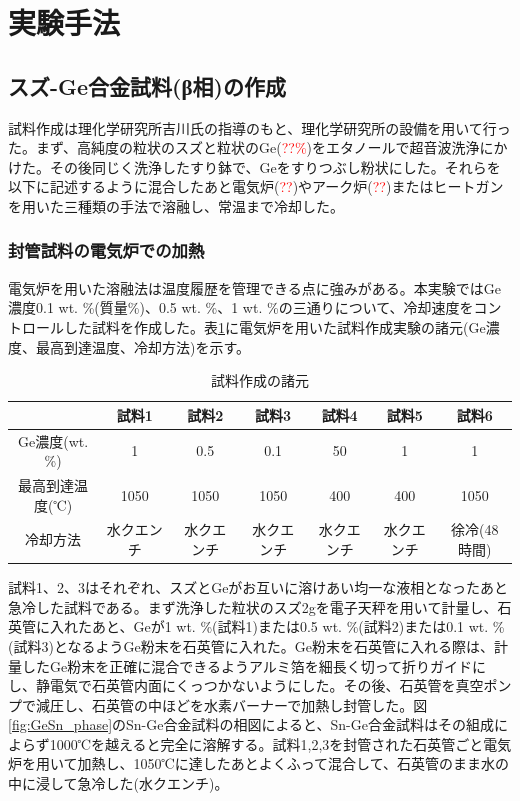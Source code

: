 \section{実験手法}
\subsection{スズ-Ge合金試料(β相)の作成}
試料作成は理化学研究所吉川氏の指導のもと、理化学研究所の設備を用いて行った。まず、高純度の粒状のスズと粒状のGe(\textcolor{red}{??\%})をエタノールで超音波洗浄にかけた。その後同じく洗浄したすり鉢で、Geをすりつぶし粉状にした。それらを以下に記述するように混合したあと電気炉(\textcolor{red}{??})やアーク炉(\textcolor{red}{??})またはヒートガンを用いた三種類の手法で溶融し、常温まで冷却した。

\subsubsection{封管試料の電気炉での加熱}
電気炉を用いた溶融法は温度履歴を管理できる点に強みがある。本実験ではGe濃度0.1 wt. \%(質量\%)、0.5 wt. \%、1 wt. \%の三通りについて、冷却速度をコントロールした試料を作成した。表\ref{tab:sample_prep_elec}に電気炉を用いた試料作成実験の諸元(Ge濃度、最高到達温度、冷却方法)を示す。
\begin{table}[!h]
    \begin{center}
  \begin{tabular}{c|cccccc}
    & 試料1 & 試料2 & 試料3 & 試料4 & 試料5 & 試料6 \\ \hline
    Ge濃度(wt. \%)  & 1 & 0.5 &  0.1 & 50 & 1 & 1\\
   最高到達温度(℃)  & 1050　& 1050 &  1050 & 400& 400 & 1050 \\
    冷却方法 & 水クエンチ & 水クエンチ& 水クエンチ& 水クエンチ& 水クエンチ &徐冷(48時間)   \\
  \end{tabular}
  \caption{試料作成の諸元}
  \label{tab:sample_prep_elec}
    \end{center}
\end{table}

試料1、2、3はそれぞれ、スズとGeがお互いに溶けあい均一な液相となったあと急冷した試料である。まず洗浄した粒状のスズ2gを電子天秤を用いて計量し、石英管に入れたあと、Geが1 wt. \%(試料1)または0.5 wt. \%(試料2)または0.1 wt. \%(試料3)となるようGe粉末を石英管に入れた。Ge粉末を石英管に入れる際は、計量したGe粉末を正確に混合できるようアルミ箔を細長く切って折りガイドにし、静電気で石英管内面にくっつかないようにした。その後、石英管を真空ポンプで減圧し、石英管の中ほどを水素バーナーで加熱し封管した。図\ref{fig:GeSn_phase}のSn-Ge合金試料の相図によると、Sn-Ge合金試料はその組成によらず1000℃を越えると完全に溶解する。試料1,2,3を封管された石英管ごと電気炉を用いて加熱し、1050℃に達したあとよくふって混合して、石英管のまま水の中に浸して急冷した(水クエンチ)。

